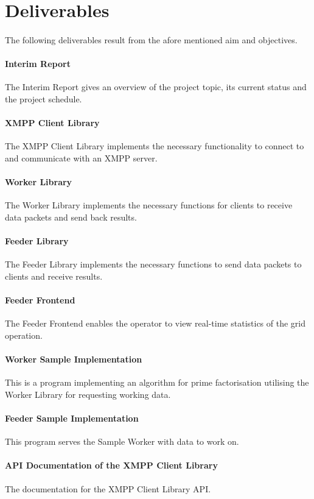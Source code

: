 \section{Deliverables}
\paragraph{}
The following deliverables result from the afore mentioned aim and objectives.

\paragraph{Interim Report} The Interim Report gives an overview of the project topic, its current status and the project schedule.
\paragraph{XMPP Client Library} The XMPP Client Library implements the necessary functionality to connect to and communicate with an XMPP server.
\paragraph{Worker Library} The Worker Library implements the necessary functions for clients to receive data packets and send back results.
\paragraph{Feeder Library} The Feeder Library implements the necessary functions to send data packets to clients and receive results.
\paragraph{Feeder Frontend} The Feeder Frontend enables the operator to view real-time statistics of the grid operation.
\paragraph{Worker Sample Implementation} This is a program implementing an algorithm for prime factorisation utilising the Worker Library for requesting working data.
\paragraph{Feeder Sample Implementation} This program serves the Sample Wor\-ker with data to work on.
\paragraph{API Documentation of the XMPP Client Library} The documentation for the XMPP Client Library API.
